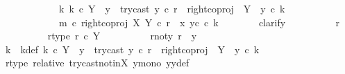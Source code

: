 \begin{isabellebody}
\ \ \ \ \ \ \ \ \ \ \ \ {\isasymexists}k{\isachardot}{\kern0pt}\ k\ {\isasymin}\isactrlsub c\ Y\ {\isasymsetminus}\ {\isacharparenleft}{\kern0pt}{\isasymone}{\isacharcomma}{\kern0pt}y{}{\isacharparenright}{\kern0pt}\ {\isasymand}\ try{\isacharunderscore}{\kern0pt}cast\ y{}\ {\isasymcirc}\isactrlsub c\ r\ {\isacharequal}{\kern0pt}\ right{\isacharunderscore}{\kern0pt}coproj\ {\isasymone}\ {\isacharparenleft}{\kern0pt}Y\ {\isasymsetminus}\ {\isacharparenleft}{\kern0pt}{\isasymone}{\isacharcomma}{\kern0pt}y{}{\isacharparenright}{\kern0pt}{\isacharparenright}{\kern0pt}\ {\isasymcirc}\isactrlsub c\ k\ {\isasymand}\ \isanewline
\ \ \ \ \ \ \ \ \ \ \ \ m\ {\isasymcirc}\isactrlsub c\ right{\isacharunderscore}{\kern0pt}coproj\ X\ Y\ {\isasymcirc}\isactrlsub c\ r\ {\isacharequal}{\kern0pt}\ {\isasymlangle}x{}{\isacharcomma}{\kern0pt}\ y{}\isactrlsup c\ {\isasymcirc}\isactrlsub c\ k{\isasymrangle}{\isachardoublequoteclose}\isanewline
\ \ \ \ \ \ \isamarkupfalse%
\ clarify\isanewline
\ \ \ \ \ \ \ \ \isamarkupfalse%
\ r\ \isanewline
\ \ \ \ \ \ \ \ \isamarkupfalse%
\ r{\isacharunderscore}{\kern0pt}type{\isacharcolon}{\kern0pt}\ {\isachardoublequoteopen}r\ {\isasymin}\isactrlsub c\ Y{\isachardoublequoteclose}\isanewline
\ \ \ \ \ \ \ \ \isamarkupfalse%
\ r{\isacharunderscore}{\kern0pt}not{\isacharunderscore}{\kern0pt}y{}{\isacharcolon}{\kern0pt}\ {\isachardoublequoteopen}r\ {\isasymnoteq}\ y{}{\isachardoublequoteclose}\isanewline
\ \ \ \ \ \ \ \ \isamarkupfalse%
\ \isamarkupfalse%
\ k\ \ k{\isacharunderscore}{\kern0pt}def{\isacharcolon}{\kern0pt}\ {\isachardoublequoteopen}k\ {\isasymin}\isactrlsub c\ Y\ {\isasymsetminus}\ {\isacharparenleft}{\kern0pt}{\isasymone}{\isacharcomma}{\kern0pt}y{}{\isacharparenright}{\kern0pt}\ {\isasymand}\ try{\isacharunderscore}{\kern0pt}cast\ y{}\ {\isasymcirc}\isactrlsub c\ r\ {\isacharequal}{\kern0pt}\ right{\isacharunderscore}{\kern0pt}coproj\ {\isasymone}\ {\isacharparenleft}{\kern0pt}Y\ {\isasymsetminus}\ {\isacharparenleft}{\kern0pt}{\isasymone}{\isacharcomma}{\kern0pt}y{}{\isacharparenright}{\kern0pt}{\isacharparenright}{\kern0pt}\ {\isasymcirc}\isactrlsub c\ k{\isachardoublequoteclose}\isanewline
\ \ \ \ \ \ \ \ \ \ \isamarkupfalse%
\ r{\isacharunderscore}{\kern0pt}type\ relative\ try{\isacharunderscore}{\kern0pt}cast{\isacharunderscore}{\kern0pt}not{\isacharunderscore}{\kern0pt}in{\isacharunderscore}{\kern0pt}X\ y{}{\isacharunderscore}{\kern0pt}mono\ y{}y{}{\isacharunderscore}{\kern0pt}def{\isacharparenleft}{\kern0pt}{}{\isacharparenright}{\kern0pt}\ \isamarkupfalse%

\end{isabellebody}
